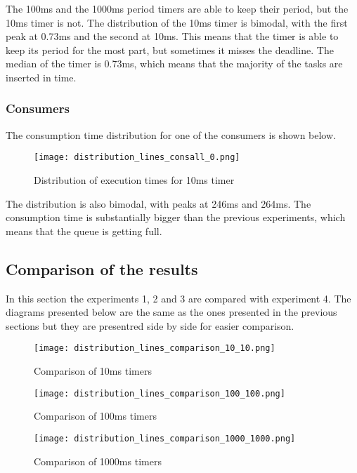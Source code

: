 \documentclass[12pt, a4paper]{report}
\begin{document}
The 100ms and the 1000ms period timers are able to keep their period, but the 10ms timer
is not. The distribution of the 10ms timer is bimodal, with the first peak at 0.73ms and
the second at 10ms. This means that the timer is able to keep its period for the most part,
but sometimes it misses the deadline. The median of the timer is 0.73ms, which means that the majority of the tasks are inserted
in time.


\subsubsection*{Consumers}

The consumption time distribution for one of the consumers is shown below.

\begin{figure}[H]
    \centering
    \texttt{[image: distribution\_lines\_consall\_0.png]}
    \caption{Distribution of execution times for 10ms timer}
\end{figure}


The distribution is also bimodal, with peaks at 246ms and 264ms. 
The consumption time is substantially bigger than the previous experiments,
which means that the queue is getting full.

\subsection*{Comparison of the results}

In this section the experiments 1, 2 and 3 are compared
with experiment 4. The diagrams presented below are the 
same as the ones presented in the previous sections but
they are presentred side by side for easier comparison.

\begin{figure}[H]
    \centering
    \texttt{[image: distribution\_lines\_comparison\_10\_10.png]}
    \caption{Comparison of 10ms timers}
\end{figure}

\begin{figure}[H]
    \centering
    \texttt{[image: distribution\_lines\_comparison\_100\_100.png]}
    \caption{Comparison of 100ms timers}
\end{figure}

\begin{figure}[H]
    \centering
    \texttt{[image: distribution\_lines\_comparison\_1000\_1000.png]}
    \caption{Comparison of 1000ms timers}
\end{figure}
\end{document}
